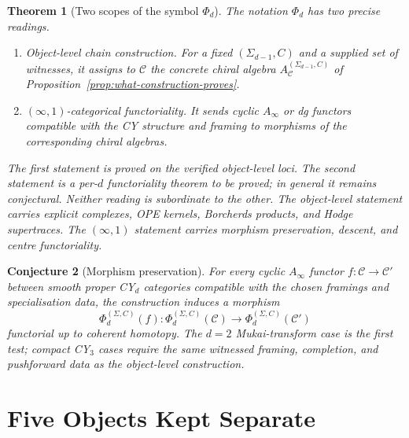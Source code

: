 \documentclass[11pt]{article}
\newtheorem{theorem}{Theorem}[section]
\newtheorem{conjecture}[theorem]{Conjecture}
\providecommand{\Ainf}{A_{\infty}}
\providecommand{\cC}{\mathcal{C}}
\begin{document}
\begin{theorem}[Two scopes of the symbol $\Phi_d$]
\label{thm:two-scopes}
The notation $\Phi_d$ has two precise readings.
\begin{enumerate}[label=\textup{(\alph*)}]
 \item \emph{Object-level chain construction.}  For a fixed
 $(\Sigma_{d-1},C)$ and a supplied set of witnesses, it assigns to
 $\cC$ the concrete chiral algebra
 $A_\cC^{(\Sigma_{d-1},C)}$ of
 Proposition~\ref{prop:what-construction-proves}.
 \item \emph{$(\infty,1)$-categorical functoriality.}  It sends cyclic
 $\Ainf$ or dg functors compatible with the CY structure and framing to
 morphisms of the corresponding chiral algebras.
\end{enumerate}
The first statement is proved on the verified object-level loci.  The
second statement is a per-$d$ functoriality theorem to be proved; in
general it remains conjectural.  Neither reading is subordinate to the
other.  The object-level statement carries explicit complexes, OPE
kernels, Borcherds products, and Hodge supertraces.  The
$(\infty,1)$ statement carries morphism preservation, descent, and
centre functoriality.
\end{theorem}

\begin{conjecture}[Morphism preservation]
\label{conj:morphism-preservation}
For every cyclic $\Ainf$ functor
$f\colon\cC\to\cC'$ between smooth proper CY$_d$ categories compatible
with the chosen framings and specialisation data, the construction
induces a morphism
\[
 \Phi_d^{(\Sigma,C)}(f)\colon
 \Phi_d^{(\Sigma,C)}(\cC)\longrightarrow
 \Phi_d^{(\Sigma,C)}(\cC')
\]
functorial up to coherent homotopy.  The $d=2$ Mukai-transform case is
the first test; compact CY$_3$ cases require the same witnessed
framing, completion, and pushforward data as the object-level
construction.
\end{conjecture}

\section{Five Objects Kept Separate}
\end{document}
